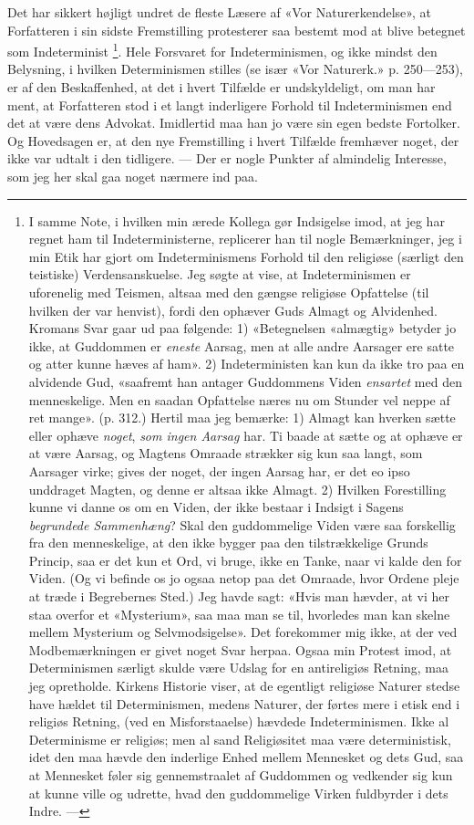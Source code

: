 \documentclass[12pt,a4paper,openany]{book}
\newcommand{\opage}[1]{\marginnote{\footnotesize\textit{[#1]}}}
\begin{document}
Det har sikkert højligt undret de fleste Læsere af «Vor Naturerkendelse», at
Forfatteren i sin sidste Fremstilling protesterer saa bestemt mod at blive
betegnet som Indeterminist%
\footnote[1]{I samme Note, i hvilken min ærede Kollega gør Indsigelse imod, at
jeg har regnet ham til Indeterministerne, replicerer han til nogle
Bemærkninger, jeg i min Etik har gjort om Indeterminismens Forhold til den
religiøse (særligt den teistiske) Verdensanskuelse. Jeg søgte at vise, at
Indeterminismen er uforenelig med Teismen, altsaa med den gængse religiøse
Opfattelse (til hvilken der var henvist), fordi den ophæver Guds Almagt og
Alvidenhed. Kromans Svar gaar ud paa følgende: 1) «Betegnelsen «almægtig»
betyder jo ikke, at Guddommen er \emph{eneste} Aarsag, men at alle andre
Aarsager ere satte og atter kunne hæves af ham». 2) Indeterministen kan kun da
ikke tro paa en alvidende Gud, «saafremt han antager Guddommens Viden
\emph{ensartet} med den menneskelige. Men en saadan Opfattelse næres nu om
Stunder vel neppe af ret mange». (p. 312.) Hertil maa jeg bemærke: 1) Almagt
kan hverken sætte eller ophæve \emph{noget}, \emph{som ingen Aarsag} har. Ti
baade at sætte og at ophæve er at være Aarsag, og Magtens Omraade strækker sig
kun saa langt, som Aarsager virke; gives der noget, der ingen Aarsag har, er
det eo ipso unddraget Magten, og denne er altsaa ikke Almagt. 2) Hvilken
Forestilling kunne vi danne os om en Viden, der ikke bestaar i Indsigt i Sagens
\emph{begrundede Sammenhæng}? Skal den guddommelige Viden være saa forskellig
fra den menneskelige, at den ikke bygger paa den tilstrækkelige Grunds Princip,
saa er det kun et Ord, vi bruge, ikke en Tanke, naar vi kalde den for Viden.
(Og vi befinde os jo ogsaa netop paa det Omraade, hvor Ordene pleje at træde i
Begrebernes Sted.) Jeg havde sagt: «Hvis man hævder, at vi her staa overfor et
«Mysterium», saa maa man se til, hvorledes man kan skelne mellem Mysterium og
Selvmodsigelse». Det forekommer mig ikke, at der ved Modbemærkningen er givet
noget Svar herpaa. Ogsaa min Protest imod, at Determinismen særligt skulde være
Udslag for en antireligiøs Retning, maa jeg opretholde. Kirkens Historie viser,
at de egentligt religiøse Naturer stedse have hældet til Determinismen, medens
Naturer, der førtes mere i etisk end i religiøs Retning, (ved en
Misforstaaelse) hævdede Indeterminismen. Ikke al Determinisme er religiøs; men
al sand Religiøsitet maa være deterministisk, idet den maa hævde den inderlige
Enhed mellem Mennesket og dets Gud, saa at Mennesket føler sig gennemstraalet
af Guddommen og vedkender sig kun at kunne ville og udrette, hvad den
guddommelige Virken fuldbyrder i dets Indre. ---}. Hele Forsvaret for
Indeterminismen, og ikke mindst den Belysning, i hvilken
\setcounter{footnote}{0}%
\opage{100}Determinismen stilles (se især «Vor Naturerk.» p. 250---253), er af
den Beskaffenhed, at det i hvert Tilfælde er undskyldeligt, om man har ment, at
Forfatteren stod i et langt inderligere Forhold til Indeterminismen end det at
være dens Advokat. Imidlertid maa han jo være sin egen bedste Fortolker. Og
Hovedsagen er, at den nye Fremstilling i hvert Tilfælde fremhæver noget, der
ikke var udtalt i den tidligere. --- Der er nogle Punkter af almindelig
Interesse, som jeg her skal gaa noget nærmere ind paa.
\end{document}
